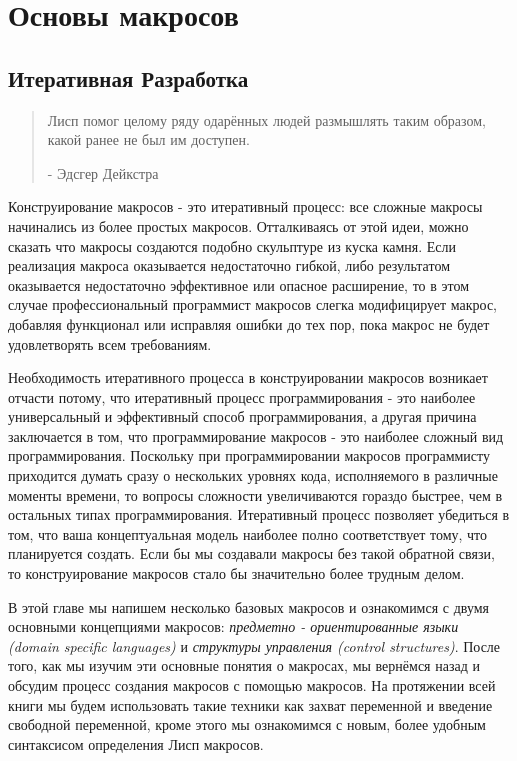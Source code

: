 \chapter{Основы макросов}\label{chapter_macro_basics}
\section{Итеративная Разработка}\label{section_iterative-development}
\begin{quote}
Лисп помог целому ряду одарённых людей размышлять таким образом, какой ранее не был им доступен.

- Эдсгер Дейкстра
\end{quote}

Конструирование макросов - это итеративный процесс: все сложные макросы начинались из более простых макросов. Отталкиваясь от этой идеи, можно сказать что макросы создаются подобно скульптуре из куска камня. Если реализация макроса оказывается недостаточно гибкой, либо результатом оказывается недостаточно эффективное или опасное расширение, то в этом случае профессиональный программист макросов слегка модифицирует макрос, добавляя функционал или исправляя ошибки до тех пор, пока макрос не будет удовлетворять всем требованиям.

Необходимость итеративного процесса в конструировании макросов возникает отчасти потому, что итеративный процесс программирования - это наиболее универсальный и эффективный способ программирования, а другая причина заключается в том, что программирование макросов - это наиболее сложный вид программирования. Поскольку при программировании макросов программисту приходится думать сразу о нескольких уровнях кода, исполняемого в различные моменты времени, то вопросы сложности увеличиваются гораздо быстрее, чем в остальных типах программирования. Итеративный процесс позволяет убедиться в том, что ваша концептуальная модель наиболее полно соответствует тому, что планируется создать. Если бы мы создавали макросы без такой обратной связи, то конструирование макросов стало бы значительно более трудным делом.

В этой главе мы напишем несколько базовых макросов и ознакомимся с двумя основными концепциями макросов: \emph{предметно - ориентированные языки (domain specific languages)} и \emph{структуры управления (control structures)}. После того, как мы изучим эти основные понятия о макросах, мы вернёмся назад и обсудим процесс создания макросов с помощью макросов. На протяжении всей книги мы будем использовать такие техники как захват переменной и введение свободной переменной, кроме этого мы ознакомимся с новым, более удобным синтаксисом определения Лисп макросов.

